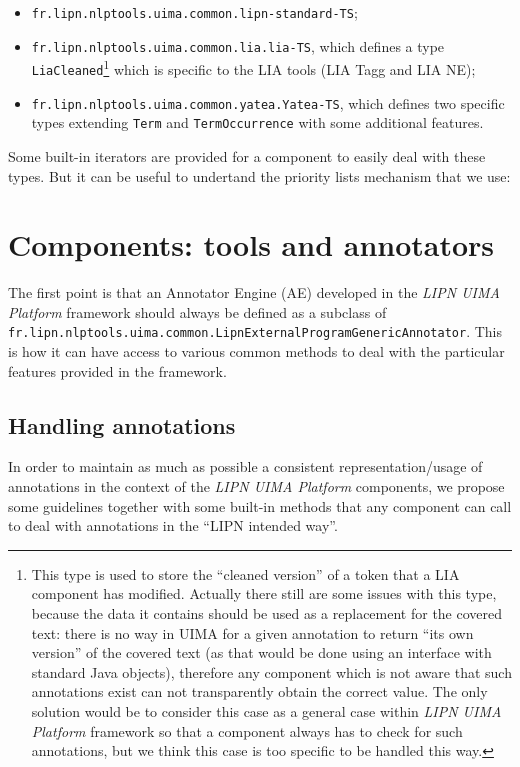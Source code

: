 \documentclass{article}
\newcommand{\softName}{{\em LIPN UIMA Platform}\xspace}
\newenvironment{xenumerate}{
\begin{enumerate}
  \setlength{\itemsep}{.3\baselineskip}
  \setlength{\topsep}{0pt}
  \setlength{\parskip}{0pt}
  \setlength{\parsep}{0pt}
}{\end{enumerate}}
\newenvironment{xitemize}{
\begin{itemize}
  \setlength{\itemsep}{.3\baselineskip}
  \setlength{\topsep}{0pt}
  \setlength{\parskip}{0pt}
  \setlength{\parsep}{0pt}
}{\end{itemize}}
\newcommand{\todo}[1]{{\large \sf [TODO #1]}}
\newcommand{\packname}{fr.lipn.nlptools}
\newcommand{\uimaPackname}{\packname.uima}
\begin{document}
\begin{xenumerate}
\begin{xitemize}
\item {\tt fr.lipn.nlptools.uima.common.lipn-standard-TS};
\item {\tt fr.lipn.nlptools.uima.common.lia.lia-TS}, which defines a type {\tt LiaCleaned}\footnote{This type is used to store the ``cleaned version'' of a token that a LIA component has modified. Actually there still are some issues with this type, because the data it contains should be used as a replacement for the covered text: there is no way in UIMA for a given annotation to return ``its own version'' of the covered text (as that would be done using an interface with standard Java objects), therefore any component which is not aware that such annotations exist can not transparently obtain the correct value. The only solution would be to consider this case as a general case within \softName framework so that a component always has to check for such annotations, but we think this case is too specific to be handled this way.} which is specific to the LIA tools (LIA Tagg and LIA NE);
\item {\tt fr.lipn.nlptools.uima.common.yatea.Yatea-TS}, which defines two specific types extending {\tt Term} and {\tt TermOccurrence} with some additional features.
\end{xitemize}
\end{xenumerate}

Some built-in iterators are provided for a component to easily deal with these types. But it can be useful to undertand the priority lists mechanism that we use: \todo{à finir}


\section{Components: tools and annotators}


\todo{not platform independent!}

The first point is that an Annotator Engine (AE) developed in the \softName framework should always be defined as a subclass of {\tt \uimaPackname.common.LipnExternalProgramGenericAnnotator}. This is how it can have access to various common methods to deal with the particular features provided in the framework.

\subsection{Handling annotations}

\label{partLIPNAnnotations}
In order to maintain as much as possible a consistent representation/usage of annotations in the context of the \softName components, we propose some guidelines together with some built-in methods that any component can call to deal with annotations in the ``LIPN intended way''.
\end{document}
